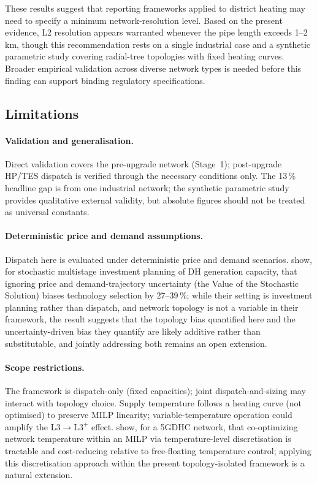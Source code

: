\documentclass[a4paper,fleqn]{cas-dc}
\newcommand{\Lplus}{\mathrm{L3}^{+}}
\begin{document}
These results suggest that  reporting frameworks applied
to district heating may need to specify a minimum
network-resolution level. Based on the present evidence, L2
resolution appears warranted whenever the pipe length exceeds
1--2\,km, though this recommendation rests on a single industrial
case and a synthetic parametric study covering radial-tree topologies with
fixed heating curves. Broader empirical validation across diverse
network types is needed before this finding can support binding
regulatory specifications.

\subsection{Limitations}
\label{sec:discussion_limitations}

\paragraph{Validation and generalisation.}
Direct validation covers the pre-upgrade network (Stage~1);
post-upgrade HP/TES dispatch is verified through the necessary
conditions only. The 13\,\% headline gap is from one industrial
network; the synthetic parametric study provides qualitative external validity,
but absolute figures should not be treated as universal constants.

\paragraph{Deterministic price and demand assumptions.}
Dispatch here is evaluated under deterministic price and demand
scenarios. \citet{Koek2026} show, for stochastic multistage
investment planning of DH generation capacity, that ignoring price
and demand-trajectory uncertainty (the Value of the Stochastic
Solution) biases technology selection by 27--39\,\%; while their
setting is investment planning rather than dispatch, and network
topology is not a variable in their framework, the result suggests
that the topology bias quantified here and the uncertainty-driven
bias they quantify are likely additive rather than substitutable,
and jointly addressing both remains an open extension.

\paragraph{Scope restrictions.}
The framework is dispatch-only (fixed capacities); joint
dispatch-and-sizing may interact with topology choice. Supply
temperature follows a heating curve (not optimised) to preserve
MILP linearity; variable-temperature operation could amplify the
L3$\to\Lplus$ effect. \citet{Wirtz2021_tempcontrol} show, for a
5GDHC network, that co-optimizing network temperature within an
MILP via temperature-level discretisation is tractable and
cost-reducing relative to free-floating temperature control;
applying this discretisation approach within the present
topology-isolated framework is a natural extension.
\end{document}
